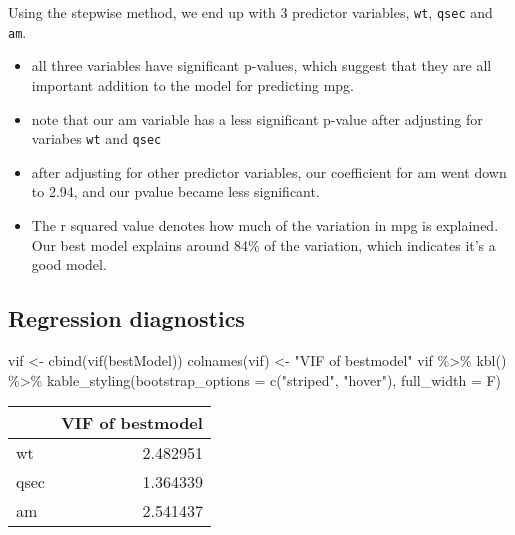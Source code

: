 \documentclass[
]{article}
\newenvironment{Shaded}{\begin{snugshade}}{\end{snugshade}}
\newcommand{\AttributeTok}[1]{\textcolor[rgb]{0.77,0.63,0.00}{#1}}
\newcommand{\FunctionTok}[1]{\textcolor[rgb]{0.00,0.00,0.00}{#1}}
\newcommand{\NormalTok}[1]{#1}
\newcommand{\OtherTok}[1]{\textcolor[rgb]{0.56,0.35,0.01}{#1}}
\newcommand{\SpecialCharTok}[1]{\textcolor[rgb]{0.00,0.00,0.00}{#1}}
\newcommand{\StringTok}[1]{\textcolor[rgb]{0.31,0.60,0.02}{#1}}
\providecommand{\tightlist}{%
  \setlength{\itemsep}{0pt}\setlength{\parskip}{0pt}}
\begin{document}
Using the stepwise method, we end up with 3 predictor variables,
\texttt{wt}, \texttt{qsec} and \texttt{am}.

\begin{itemize}
\tightlist
\item
  all three variables have significant p-values, which suggest that they
  are all important addition to the model for predicting mpg.
\item
  note that our am variable has a less significant p-value after
  adjusting for variabes \texttt{wt} and \texttt{qsec}
\item
  after adjusting for other predictor variables, our coefficient for am
  went down to 2.94, and our pvalue became less significant.
\item
  The r squared value denotes how much of the variation in mpg is
  explained. Our best model explains around 84\% of the variation, which
  indicates it's a good model.
\end{itemize}

\hypertarget{regression-diagnostics}{%
\subsection{Regression diagnostics}\label{regression-diagnostics}}

\begin{Shaded}
\begin{Highlighting}[]
\NormalTok{vif }\OtherTok{\textless{}{-}} \FunctionTok{cbind}\NormalTok{(}\FunctionTok{vif}\NormalTok{(bestModel))}
\FunctionTok{colnames}\NormalTok{(vif) }\OtherTok{\textless{}{-}} \StringTok{"VIF of bestmodel"}
\NormalTok{vif  }\SpecialCharTok{\%\textgreater{}\%}
  \FunctionTok{kbl}\NormalTok{() }\SpecialCharTok{\%\textgreater{}\%}
  \FunctionTok{kable\_styling}\NormalTok{(}\AttributeTok{bootstrap\_options =} \FunctionTok{c}\NormalTok{(}\StringTok{"striped"}\NormalTok{, }\StringTok{"hover"}\NormalTok{), }\AttributeTok{full\_width =}\NormalTok{ F)}
\end{Highlighting}
\end{Shaded}

\begin{table}
\centering
\begin{tabular}[t]{l|r}
\hline
  & VIF of bestmodel\\
\hline
wt & 2.482951\\
\hline
qsec & 1.364339\\
\hline
am & 2.541437\\
\hline
\end{tabular}
\end{table}
\end{document}
